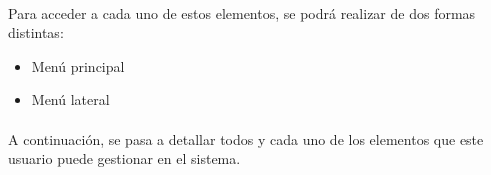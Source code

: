   \paragraph{}Para acceder a cada uno de estos elementos, se podrá realizar de
  dos formas distintas:

  \begin{itemize}
   \item Menú principal
   \item Menú lateral
  \end{itemize}


  \paragraph{}A continuación, se pasa a detallar todos y cada uno de los
  elementos que este usuario puede gestionar en el sistema.

